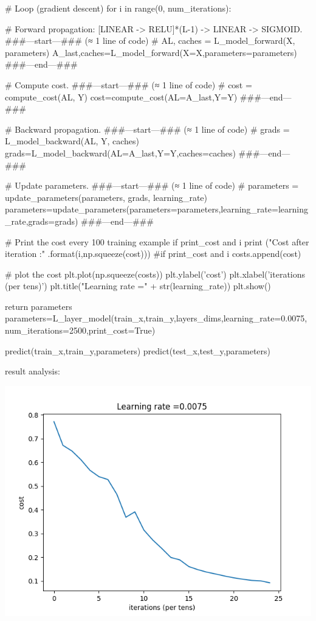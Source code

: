 \documentclass[12pt,a4paper]{article}
\begin{document}
\begin{python}
	 	# Loop (gradient descent)
	 	for i in range(0, num_iterations):
	 	
	 	# Forward propagation: [LINEAR -> RELU]*(L-1) -> LINEAR -> SIGMOID.
	 	###---start---### (≈ 1 line of code)
	 	# AL, caches = L_model_forward(X, parameters)
	 	A_last,caches=L_model_forward(X=X,parameters=parameters)
	 	###---end---###
	 	
	 	# Compute cost.
	 	###---start---### (≈ 1 line of code)
	 	# cost = compute_cost(AL, Y)
	 	cost=compute_cost(AL=A_last,Y=Y)
	 	###---end---###
	 	
	 	# Backward propagation.
	 	###---start---### (≈ 1 line of code)
	 	# grads = L_model_backward(AL, Y, caches)
	 	grads=L_model_backward(AL=A_last,Y=Y,caches=caches)
	 	###---end---###
	 	
	 	# Update parameters.
	 	###---start---### (≈ 1 line of code)
	 	# parameters = update_parameters(parameters, grads, learning_rate)
	 	parameters=update_parameters(parameters=parameters,learning_rate=learning_rate,grads=grads)
	 	###---end---###
	 	
	 	# Print the cost every 100 training example
	 	if print_cost and i %
	 	print ("Cost after iteration {}:{}" .format(i,np.squeeze(cost)))
	 	#if print_cost and i %
	 	costs.append(cost)
	 	
	 	# plot the cost
	 	plt.plot(np.squeeze(costs))
	 	plt.ylabel('cost')
	 	plt.xlabel('iterations (per tens)')
	 	plt.title("Learning rate =" + str(learning_rate))
	 	plt.show()
	 	
	 	return parameters
	 	parameters=L_layer_model(train_x,train_y,layers_dims,learning_rate=0.0075,num_iterations=2500,print_cost=True)
	 	
	 	predict(train_x,train_y,parameters)
	 	predict(test_x,test_y,parameters)
	 \end{python}
 		result analysis:\par
 		
	\includegraphics[]{Figure2_1.png}
 	
\end{document}
